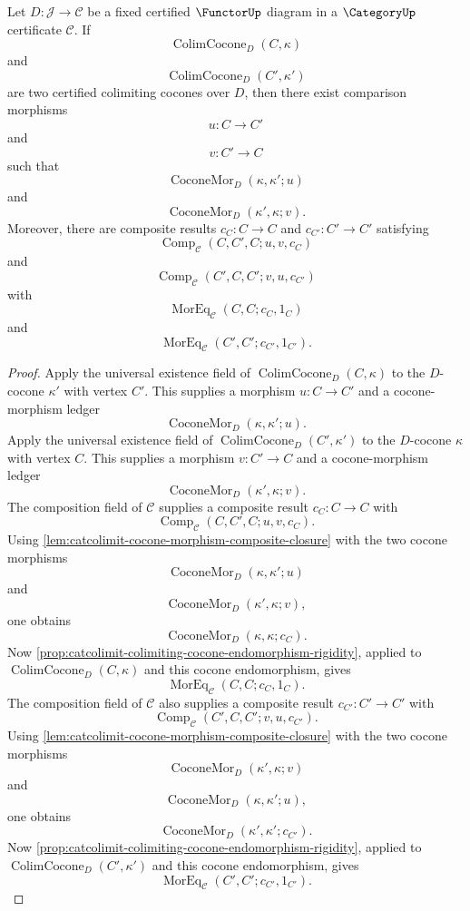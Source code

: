 \begin{theorem}\label{thm:catcolimit-universal-cocones-comparison-identities}
Let $D:\mathcal J\to\mathcal C$ be a fixed certified $\FunctorUp$ diagram in a $\CategoryUp$ certificate $\mathcal C$. If
$$
\operatorname{ColimCocone}_{D}(C,\kappa)
$$
and
$$
\operatorname{ColimCocone}_{D}(C',\kappa')
$$
are two certified colimiting cocones over $D$, then there exist comparison morphisms
$$
u:C\to C'
$$
and
$$
v:C'\to C
$$
such that
$$
\operatorname{CoconeMor}_{D}(\kappa,\kappa';u)
$$
and
$$
\operatorname{CoconeMor}_{D}(\kappa',\kappa;v).
$$
Moreover, there are composite results $c_C:C\to C$ and $c_{C'}:C'\to C'$ satisfying
$$
\operatorname{Comp}_{\mathcal C}(C,C',C;u,v,c_C)
$$
and
$$
\operatorname{Comp}_{\mathcal C}(C',C,C';v,u,c_{C'})
$$
with
$$
\operatorname{MorEq}_{\mathcal C}(C,C;c_C,1_C)
$$
and
$$
\operatorname{MorEq}_{\mathcal C}(C',C';c_{C'},1_{C'}).
$$
\end{theorem}
\begin{proof}
Apply the universal existence field of $\operatorname{ColimCocone}_{D}(C,\kappa)$ to the $D$-cocone $\kappa'$ with vertex $C'$. This supplies a morphism $u:C\to C'$ and a cocone-morphism ledger
$$
\operatorname{CoconeMor}_{D}(\kappa,\kappa';u).
$$
Apply the universal existence field of $\operatorname{ColimCocone}_{D}(C',\kappa')$ to the $D$-cocone $\kappa$ with vertex $C$. This supplies a morphism $v:C'\to C$ and a cocone-morphism ledger
$$
\operatorname{CoconeMor}_{D}(\kappa',\kappa;v).
$$
The composition field of $\mathcal C$ supplies a composite result $c_C:C\to C$ with
$$
\operatorname{Comp}_{\mathcal C}(C,C',C;u,v,c_C).
$$
Using \autoref{lem:catcolimit-cocone-morphism-composite-closure} with the two cocone morphisms
$$
\operatorname{CoconeMor}_{D}(\kappa,\kappa';u)
$$
and
$$
\operatorname{CoconeMor}_{D}(\kappa',\kappa;v),
$$
one obtains
$$
\operatorname{CoconeMor}_{D}(\kappa,\kappa;c_C).
$$
Now \autoref{prop:catcolimit-colimiting-cocone-endomorphism-rigidity}, applied to $\operatorname{ColimCocone}_{D}(C,\kappa)$ and this cocone endomorphism, gives
$$
\operatorname{MorEq}_{\mathcal C}(C,C;c_C,1_C).
$$
The composition field of $\mathcal C$ also supplies a composite result $c_{C'}:C'\to C'$ with
$$
\operatorname{Comp}_{\mathcal C}(C',C,C';v,u,c_{C'}).
$$
Using \autoref{lem:catcolimit-cocone-morphism-composite-closure} with the two cocone morphisms
$$
\operatorname{CoconeMor}_{D}(\kappa',\kappa;v)
$$
and
$$
\operatorname{CoconeMor}_{D}(\kappa,\kappa';u),
$$
one obtains
$$
\operatorname{CoconeMor}_{D}(\kappa',\kappa';c_{C'}).
$$
Now \autoref{prop:catcolimit-colimiting-cocone-endomorphism-rigidity}, applied to $\operatorname{ColimCocone}_{D}(C',\kappa')$ and this cocone endomorphism, gives
$$
\operatorname{MorEq}_{\mathcal C}(C',C';c_{C'},1_{C'}).
$$
\end{proof}

